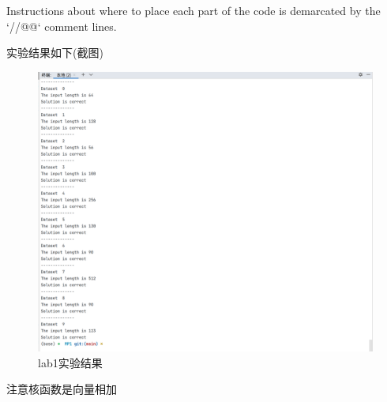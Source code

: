 \documentclass[11pt]{ctexart}
\begin{document}
Instructions about where to place each part of the code is
demarcated by the `//@@` comment lines.

\newpage
实验结果如下(截图)
\begin{figure}[ht]
	\centering
	\includegraphics[width=1.0\textwidth]{photos/lab1.png}
	\caption{lab1实验结果}
	\label{fig:1}
\end{figure}


注意核函数是向量相加
\end{document}
